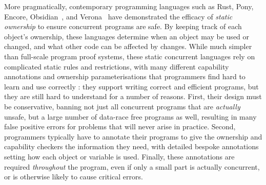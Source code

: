 More pragmatically,
contemporary programming languages such as
Rust\cite{RustBook}, Pony\cite{PonyTS},
Encore\cite{EncoreTS},
Obsidian~\cite{aldrichObsidianStudy2020}, and
Verona~\cite{Verona} 
have demonstrated the efficacy of \textit{static
  ownership}\cite{ClaPotNobOOPSLA98,NobPotVitECOOP98} %
to ensure
concurrent programs are safe.
By keeping track of each object's
ownership, these languages determine when an object may be used
or changed, and what other code can be affected by changes.
%
%
%
%
While much simpler than full-scale program proof systems, these static
concurrent 
languages rely on complicated static rules and
restrictions, with many different capability annotations and ownership
parameterisations that programmers find hard to learn and use
correctly \cite{LearnRust,VizRust,HardRust}: they support writing
correct and efficient programs, but they are still hard to understand
\cite{SafeRust,FightRust} for a number of
reasons. First, their design must be conservative, banning not just
all concurrent programs that are \textit{actually} unsafe, but a large
number of data-race free programs as well, resulting in
many false positive errors for
problems that will never arise in practice.
Second,
programmers typically have to annotate their programs to give the
ownership and capability checkers the information they need,
with detailed bespoke annotations setting how each object or
variable is used.
Finally, these annotations are required \textit{throughout}
the program,  even if only a small part is actually concurrent, or is
otherwise likely to cause critical errors.


